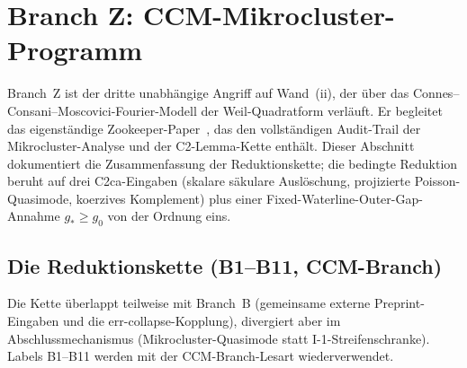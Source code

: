 \documentclass[12pt,a4paper]{article}
\theoremstyle{definition}
\theoremstyle{remark}
\begin{document}
\section{Branch Z: CCM-Mikrocluster-Programm}
\label{sec:branch-z}

Branch~Z ist der dritte unabhängige Angriff auf Wand~(ii), der über
das Connes--Consani--Moscovici-Fourier-Modell der Weil-Quadratform
verläuft. Er begleitet das eigenständige
Zookeeper-Paper~\cite{Geiger2026zookeeper}, das den vollständigen
Audit-Trail der Mikrocluster-Analyse und der C2-Lemma-Kette enthält.
Dieser Abschnitt dokumentiert die Zusammenfassung der Reduktionskette;
die bedingte Reduktion beruht auf drei C2ca-Eingaben (skalare säkulare
Auslöschung, projizierte Poisson-Quasimode, koerzives Komplement) plus
einer Fixed-Waterline-Outer-Gap-Annahme $g_*\ge g_0$ von der Ordnung
eins.


\subsection{Die Reduktionskette (B1--B11, CCM-Branch)}
\label{sec:branch-z-chain}

Die Kette überlappt teilweise mit Branch~B (gemeinsame externe
Preprint-Eingaben und die err-collapse-Kopplung), divergiert aber im
Abschlussmechanismus (Mikrocluster-Quasimode statt I-1-Streifenschranke).
Labels B1--B11 werden mit der CCM-Branch-Lesart wiederverwendet.
\end{document}
